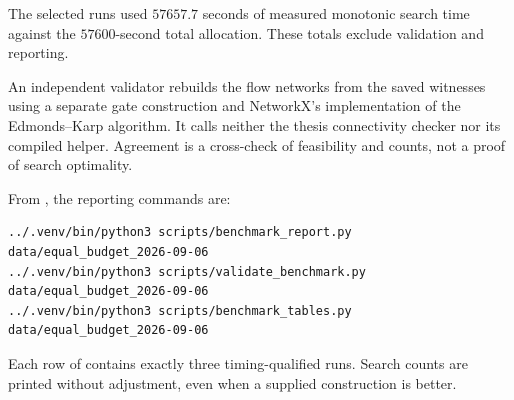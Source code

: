 The selected runs used $57657.7$ seconds of measured monotonic search time
against the $57600$-second total allocation. These totals exclude
validation and reporting.

An independent validator rebuilds the
flow networks from the saved witnesses using a separate gate construction
and NetworkX's implementation of the Edmonds--Karp algorithm. It calls neither the thesis
connectivity checker nor its compiled helper. Agreement is a cross-check of
feasibility and counts, not a proof of search optimality.

From , the reporting commands are:
\begin{lstlisting}[basicstyle=\ttfamily\scriptsize]
../.venv/bin/python3 scripts/benchmark_report.py data/equal_budget_2026-09-06
../.venv/bin/python3 scripts/validate_benchmark.py data/equal_budget_2026-09-06
../.venv/bin/python3 scripts/benchmark_tables.py data/equal_budget_2026-09-06
\end{lstlisting}

Each row of  contains exactly three timing-qualified runs. Search counts
are printed without adjustment, even when a supplied construction is better.
\begin{table}[p]
\centering\scriptsize

\caption{Equal-budget graph results at $m=3$. Each row receives three
$150$-second searches. Construction counts are supplied lower bounds, not
search inputs or assertions of optimality.}
\label{tab:equal-budget-m3-graphs}
\end{table}
\begin{table}[p]
\centering\scriptsize

\caption{Equal-budget graph results at $m=6$, under the same protocol as
.}
\label{tab:equal-budget-m6-graphs}
\end{table}
\begin{table}[p]
\centering\scriptsize

\caption{Equal-budget rank-three hypergraph results at $m=3$. Directed
hypergraphs use the forward convention. Each row receives three
$150$-second searches and construction counts are reported separately.}
\label{tab:equal-budget-m3-hypergraphs}
\end{table}
\begin{table}[p]
\centering\scriptsize

\caption{Equal-budget rank-three hypergraph results at $m=6$, under the same
protocol as .}
\label{tab:equal-budget-m6-hypergraphs}
\end{table}
\clearpage

